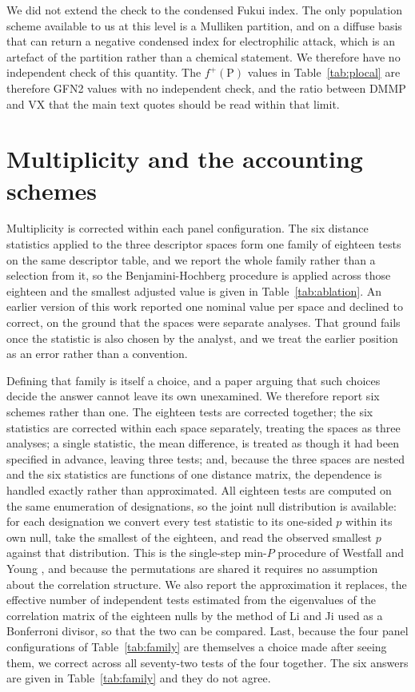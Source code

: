\documentclass[11pt,a4paper]{article}
\begin{document}
We did not extend the check to the condensed Fukui index. The only population
scheme available to us at this level is a Mulliken partition, and on a diffuse
basis that can return a negative condensed index for electrophilic attack, which
is an artefact of the partition rather than a chemical statement. We therefore
have no independent check of this quantity. The
$f^{+}(\mathrm{P})$ values in Table~\ref{tab:plocal} are therefore GFN2 values
with no independent check, and the ratio between DMMP and VX that the main text
quotes should be read within that limit.

\section{Multiplicity and the accounting schemes}
\label{meth:multiplicity}
Multiplicity is corrected within each panel configuration. The six distance
statistics applied to the three descriptor spaces form one family of eighteen
tests on the same descriptor table, and we report the whole family rather than a
selection from it, so the Benjamini-Hochberg procedure \cite{benjamini1995} is
applied across those eighteen and the smallest adjusted value is given in
Table~\ref{tab:ablation}. An earlier version of this work reported one nominal
value per space and declined to correct, on the ground that the spaces were
separate analyses. That ground fails once the statistic is also chosen by the
analyst, and we treat the earlier position as an error rather than a convention.

Defining that family is itself a choice, and a paper arguing that such choices
decide the answer cannot leave its own unexamined. We therefore report six
schemes rather than one. The eighteen tests are corrected together; the six
statistics are corrected within each space separately, treating the spaces as
three analyses; a single statistic, the mean difference, is treated as though it
had been specified in advance, leaving three tests; and, because the three
spaces are nested and the six statistics are functions of one distance matrix,
the dependence is handled exactly rather than approximated. All eighteen tests
are computed on the same enumeration of designations, so the joint null
distribution is available: for each designation we convert every test statistic
to its one-sided $p$ within its own null, take the smallest of the eighteen, and
read the observed smallest $p$ against that distribution. This is the
single-step min-$P$ procedure of Westfall and Young \cite{westfall1993}, and
because the permutations are shared it requires no assumption about the
correlation structure. We also report the approximation it replaces, the
effective number of independent tests estimated from the eigenvalues of the
correlation matrix of the eighteen nulls by the method of Li and Ji
\cite{liji2005} used as a Bonferroni divisor, so that the two can be compared.
Last, because the four panel configurations of Table~\ref{tab:family} are
themselves a choice made after seeing them, we correct across all seventy-two
tests of the four together. The six answers are given in
Table~\ref{tab:family} and they do not agree.
\end{document}
